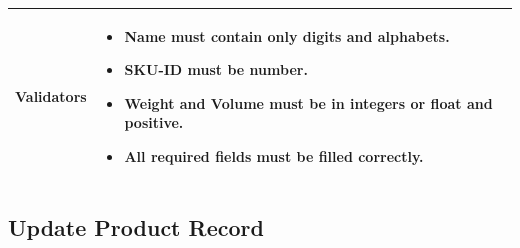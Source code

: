 \documentclass[12pt,a4paper]{article}
\begin{document}
\begin{longtable}{| p{3cm}|p{12cm}|}
Validators & 
\begin{itemize}
\item Name must contain only digits and alphabets.
\item SKU-ID must be number.
\item Weight and Volume must be in integers or float and positive.
\item All required fields must be filled correctly. 

\end{itemize}
\\ \hline

\end{longtable}
\subsection{Update Product Record}
\end{document}
